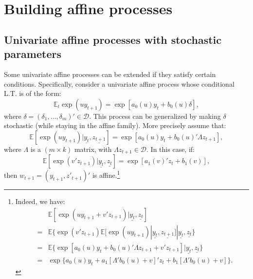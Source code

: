 \documentclass[
  12pt,
]{book}
\theoremstyle{definition}
\theoremstyle{definition}
\theoremstyle{definition}
\theoremstyle{definition}
\theoremstyle{remark}
\begin{document}
\hypertarget{building}{%
\section{Building affine processes}\label{building}}

\hypertarget{stoch}{%
\subsection{Univariate affine processes with stochastic parameters}\label{stoch}}

Some univariate affine processes can be extended if they satisfy certain conditions. Specifically, consider a univariate affine process whose conditional L.T. is of the form:
\begin{equation}
\mathbb{E}_t   \exp(u y_{t+1}) = \exp[a_0(u)y_t+b_0(u)\delta],\label{eq:extaffine}
\end{equation}
where \(\delta = (\delta_1,\dots,\delta_m)' \in \mathcal{D}\). This process can be generalized by making \(\delta\) stochastic (while staying in the affine family). More precisely assume that:
\[
\mathbb{E}[\exp(u y_{t+1})|\underline{y_t}, \underline{z_{t+1}}] = \exp[a_0(u)y_t+b_0(u)'\Lambda z_{t+1}],
\]
where \(\Lambda\) is a \((m\times k)\) matrix, with \(\Lambda z_{t+1} \in \mathcal{D}\). In this case, if:
\[
\mathbb{E}[\exp(v' z_{t+1})|\underline{y_t}, \underline{z_{t}}] = \exp[a_1(v)'z_t+b_1(v)],
\]
then \(w_{t+1} = (y_{t+1}, z'_{t+1})'\) is affine.\footnote{Indeed, we have:
  \begin{eqnarray*}
  &&\mathbb{E}[\exp(u y_{t+1}+v'z_{t+1})|\underline{y_t}, \underline{z_{t}}] \\
  &=& \mathbb{E}\{\exp(v' z_{t+1})\mathbb{E}[\exp(u y_{t+1})|\underline{y_t},
  \underline{z_{t+1}}]|\underline{y_t}, \underline{z_{t}} \} \\
  &=& \mathbb{E}\{\exp[a_0(u) y_{t}+b_0(u)'\Lambda z_{t+1}+v'z_{t+1}]|\underline{y_t},
  \underline{z_{t}} \} \\
  &=& \exp\{ a_0(u) y_{t}+a_1[\Lambda' b_0(u)+v]'z_t+b_1 [\Lambda' b_0(u)+v]\}.
  \end{eqnarray*}}
\end{document}
